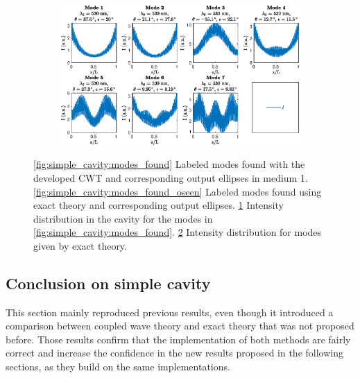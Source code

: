 \begin{figure}
\begin{subfigure}{.49\textwidth}
		\caption{}
		\label{fig:simple_cavity:intensity_distribution}
	\end{subfigure}
	\begin{subfigure}{.49\textwidth}
		\includegraphics[width=\textwidth]{plots/simple/intensity_distribution_oseen}
		\caption{}
		\label{fig:simple_cavity:intensity_distribution_oseen}
	\end{subfigure}
	\caption[Comparison of intensity distribution for a simple cavity.]{\ref{fig:simple_cavity:modes_found} Labeled modes found with the developed CWT and corresponding output ellipses in medium 1. \ref{fig:simple_cavity:modes_found_oseen} Labeled modes found using exact theory and corresponding output ellipses. \ref{fig:simple_cavity:intensity_distribution} Intensity distribution in the cavity for the modes in \ref{fig:simple_cavity:modes_found}. \ref{fig:simple_cavity:intensity_distribution_oseen} Intensity distribution for modes given by exact theory.}
	\label{fig:simple_cavity:modes}
\end{figure}

\subsection{Conclusion on simple cavity}

This section mainly reproduced previous results, even though it introduced a comparison between coupled wave theory and exact theory that was not proposed before. Those results confirm that the implementation of both methods are fairly correct and increase the confidence in the new results proposed in the following sections, as they build on the same implementations.